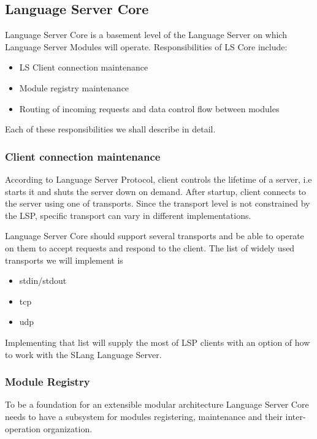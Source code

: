 \subsection{Language Server Core}
\label{sec:met:arch:core}
Language Server Core is a basement level of the Language Server on which Language Server Modules will operate.
Responsibilities of LS Core include:
\begin{itemize}
    \item LS Client connection maintenance
    \item Module registry maintenance
    \item Routing of incoming requests and data control flow between modules
\end{itemize}

Each of these responsibilities we shall describe in detail.

\subsubsection{Client connection maintenance}
\label{sec:met:arch:core:connection_maintenance}
According to Language Server Protocol\cite{Sourcegraph}, client controls the lifetime of a server, 
i.e starts it and shuts the server down on demand. After startup, client connects to the server
using one of transports. Since the transport level is not constrained by the LSP, specific transport 
can vary in different implementations.

Language Server Core should support several transports and be able to operate on them to accept requests 
and respond to the client. The list of widely used transports we will implement is
\begin{itemize}
    \item stdin/stdout
    \item tcp
    \item udp
\end{itemize}
Implementing that list will supply the most of LSP clients with an option of how to work with the SLang Language Server.  

\subsubsection{Module Registry}
\label{sec:met:arch:core:module_registry}

To be a foundation for an extensible modular architecture Language Server Core needs to have a subsystem 
for modules registering, maintenance and their inter-operation organization.

